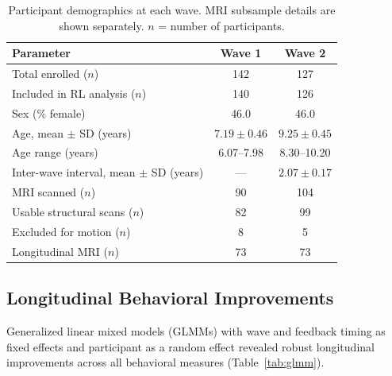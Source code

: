 \documentclass[11pt]{article}
\begin{document}
\begin{table}[H]
\centering
\caption{Participant demographics at each wave. MRI subsample details are shown separately. $n$ = number of participants.}
\label{tab:demographics}
\begin{tabular}{lcc}
\toprule
\textbf{Parameter} & \textbf{Wave 1} & \textbf{Wave 2} \\
\midrule
Total enrolled ($n$) & 142 & 127 \\
Included in RL analysis ($n$) & 140 & 126 \\
Sex (\% female) & 46.0 & 46.0 \\
Age, mean $\pm$ SD (years) & $7.19 \pm 0.46$ & $9.25 \pm 0.45$ \\
Age range (years) & 6.07--7.98 & 8.30--10.20 \\
Inter-wave interval, mean $\pm$ SD (years) & --- & $2.07 \pm 0.17$ \\
\midrule
MRI scanned ($n$) & 90 & 104 \\
Usable structural scans ($n$) & 82 & 99 \\
Excluded for motion ($n$) & 8 & 5 \\
Longitudinal MRI ($n$) & 73 & 73 \\
\bottomrule
\end{tabular}
\end{table}

\subsection{Longitudinal Behavioral Improvements}

Generalized linear mixed models (GLMMs) with wave and feedback timing as fixed effects and participant as a random effect revealed robust longitudinal improvements across all behavioral measures (Table~\ref{tab:glmm}).
\end{document}

